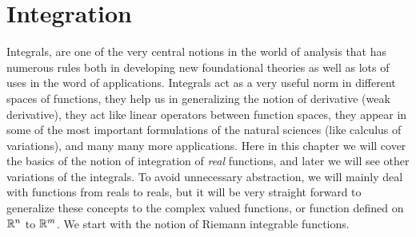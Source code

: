 \chapter{Integration}

Integrals, are one of the very central notions in the world of analysis that has numerous rules both in developing new foundational theories as well as lots of uses in the word of applications. Integrals act as a very useful norm in different spaces of functions, they help us in generalizing the notion of derivative (weak derivative), they act like linear operators between function spaces, they appear in some of the most important formulations of the natural sciences (like calculus of variations), and many many more applications. Here in this chapter we will cover the basics of the notion of integration of \emph{real} functions, and later we will see other variations of the integrals. To avoid unnecessary abstraction, we will mainly deal with functions from reals to reals, but it will be very straight forward to generalize these concepts to the complex valued functions, or function defined on $\mathbb{R}^n$ to $\mathbb{R}^m$. We start with the notion of Riemann integrable functions.

